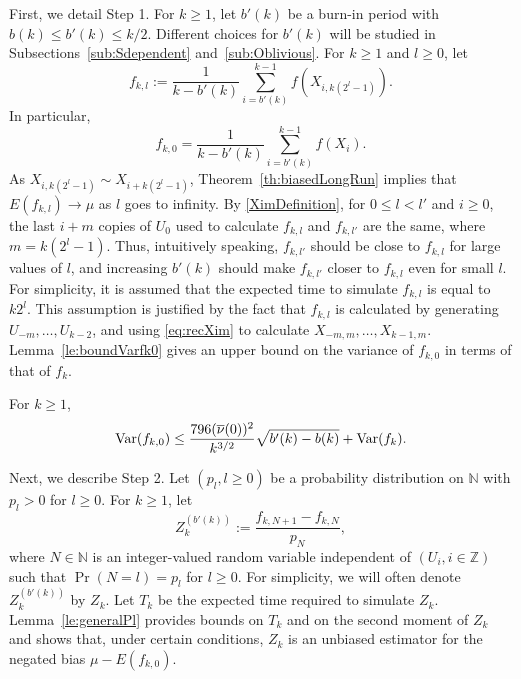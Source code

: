 \documentclass[a4paper,11pt]{article}
\begin{document}
First, we detail Step 1. For  \(k\ge1\), let \(b'(k)\) be a burn-in period with \(b(k)\le b'(k)\le k/2\).   Different choices for \(b'(k)\) will be studied in Subsections~\ref{sub:Sdependent} and~\ref{sub:Oblivious}. For  \(k\ge1\) and \(l\ge0\), let \begin{equation}\label{eq:fklDef}
f_{k,l}:=\frac{1}{k-b'(k)}\sum ^{k-1}_{i=b'(k)}f(X_{i,k(2^{l}-1)}).
\end{equation}
In particular,
\begin{equation}\label{eq:fk0def}
f_{k,0}=\frac{1}{k-b'(k)}\sum ^{k-1}_{i=b'(k)}f(X_{i}).
\end{equation}As \(X_{i,k(2^{l}-1)}\sim X_{i+k(2^{l}-1)}\), Theorem~\ref{th:biasedLongRun} implies that \(E(f_{k,l})\rightarrow\mu\) as \(l\) goes to infinity. By \eqref{XimDefinition}, for \(0\leq l<l'\) and \(i\geq0\), the last \(i+m\) copies of \(U_{0}\) used to calculate  \(f_{k,l}\) and  \(f_{k,l'}\) are the same, where \(m=k(2^{l}-1)\). Thus, intuitively speaking,  \(f_{k,l'}\) should be close to     \(f_{k,l}\)  for large values of \(l\), and increasing  \(b'(k)\) should make  \(f_{k,l'}\) closer to     \(f_{k,l}\) even for small \(l\). 
For simplicity, it is assumed that the expected time to simulate \(f_{k,l}\) is equal to  \(k2^{l}\). This assumption is justified by the fact that \(f_{k,l}\) is calculated by generating \(U_{-m},\dots,U_{k-2}\),  
and using \eqref{eq:recXim} to calculate \(X_{-m,m},\dots,X_{k-1,m}\). Lemma~\ref{le:boundVarfk0} gives an upper bound on the  variance of \(f_{k,0}\) in terms of that of \(f_{k}\).  \begin{lemma}\label{le:boundVarfk0}For  \(k\ge1\), 
\begin{equation*}
{\rm Var}(f_{k,0})
\le\frac{796(\overline{\nu}(0))^{2}}{k^{3/2}}\sqrt{b'(k)-b(k)}+{\rm Var}(f_{k}).\end{equation*}
\end{lemma}
Next, we describe Step 2. Let \((p_{l},l\geq0)\) be a probability distribution on \(\mathbb{N}\) with \(p_{l}>0\) for \(l\ge0\).  For \(k\ge1\), let\begin{equation}\label{eq:ZkDef}
Z_{k}^{(b'(k))}:=\frac{f_{k,N+1}-f_{k,N}}{p_{N}},
\end{equation} where  \(N\in\mathbb{N}\)  is an integer-valued  random variable independent of  \((U_{i}, i\in\mathbb{Z})\)  such that \(\Pr(N=l)=p_{l}\)  for \(l\geq0\). For simplicity, we will often denote \(Z_{k}^{(b'(k))}\) by \(Z_{k}\). Let \(T_{k}\) be the expected time required to simulate \(Z_{k}\).   Lemma~\ref{le:generalPl} provides  bounds on \(T_{k}\) and on the second moment of   \(Z_{k}\)   and shows that, under certain conditions, \(Z_{k}\) is an unbiased estimator for the negated bias \(\mu-E(f_{k,0})\).
 
\end{document}
